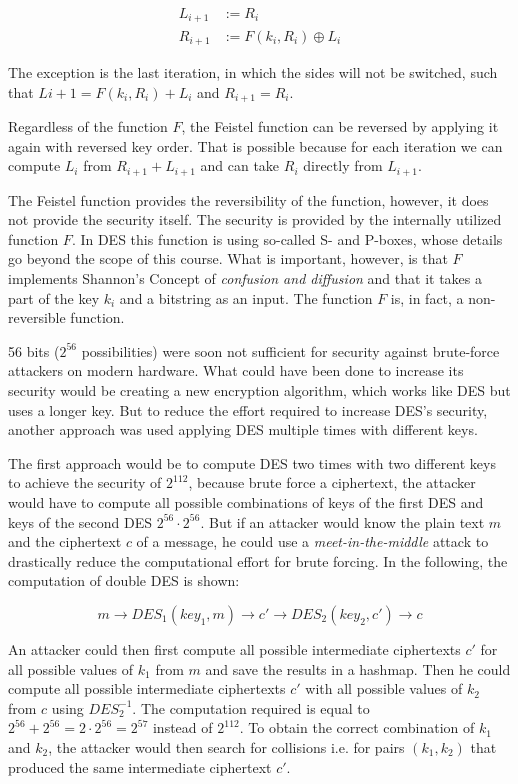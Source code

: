 \begin{align*}
    L_{i+1} & := R_i                   \\
    R_{i+1} & := F(k_i,R_i) \oplus L_i
\end{align*}

The exception is the last iteration, in which the sides will not be switched, such that $L{i+1} = F(k_i,R_i) + L_i$ and $R_{i+1} = R_i$.

Regardless of the function $F$, the Feistel function can be reversed by applying it again with reversed key order. That is possible because for each iteration we can compute $L_i$ from $R_{i+1} + L_{i+1}$ and can take $R_i$ directly from $L_{i+1}$.

The Feistel function provides the reversibility of the function, however, it does not provide the security itself. The security is provided by the internally utilized function $F$. In DES this function is using so-called S- and P-boxes, whose details go beyond the scope of this course. What is important, however, is that $F$ implements Shannon's Concept of \textit{confusion and diffusion} and that it takes a part of the key $k_i$ and a bitstring as an input. The function $F$ is, in fact, a non-reversible function.

56 bits ($2^{56}$ possibilities) were soon not sufficient for security against brute-force attackers on modern hardware. What could have been done to increase its security would be creating a new encryption algorithm, which works like DES but uses a longer key. But to reduce the effort required to increase DES's security, another approach was used \textendash{} applying DES multiple times with different keys.

The first approach would be to compute DES two times with two different keys to achieve the security of $2^{112}$, because brute force a ciphertext, the attacker would have to compute all possible combinations of keys of the first DES and keys of the second DES $2^{56} \cdot 2^{56}$. But if an attacker would know the plain text $m$ and the ciphertext $c$ of a message, he could use a \textit{meet-in-the-middle} attack to drastically reduce the computational effort for brute forcing. In the following, the computation of double DES is shown:

$$
    m \rightarrow DES_{1}(key_1, m) \rightarrow c' \rightarrow DES_{2}(key_2, c') \rightarrow c
$$

An attacker could then first compute all possible intermediate ciphertexts $c'$ for all possible values of $k_1$ from $m$ and save the results in a hashmap. Then he could compute all possible intermediate ciphertexts $c'$ with all possible values of $k_2$ from $c$ using $DES_2^{-1}$. The computation required is equal to $2^{56} + 2^{56} = 2 \cdot 2^{56} = 2^{57}$ instead of $2^{112}$. To obtain the correct combination of $k_1$ and $k_2$, the attacker would then search for collisions i.e. for pairs $(k_1, k_2)$ that produced the same intermediate ciphertext $c'$.

